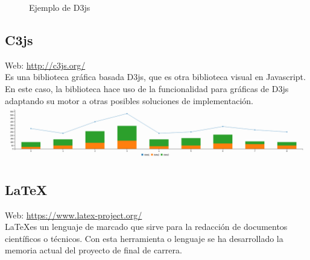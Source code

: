 \begin{figure}[H]
  \caption{Ejemplo de D3js}
\end{figure}

\subsection{C3js}

Web: \url{http://c3js.org/}\\

Es una biblioteca gráfica basada D3js, que es otra biblioteca visual en Javascript. En este caso, la biblioteca hace uso de la funcionalidad para gráficas de D3js adaptando su motor a otras posibles soluciones de implementación.\\

\includegraphics[scale=0.25]{diagramas/c3js-chart.png}

\subsection{\LaTeX}

Web: \url{https://www.latex-project.org/}\\

\LaTeX es un lenguaje de marcado que sirve para la redacción de documentos científicos o técnicos. Con esta herramienta o lenguaje se ha desarrollado la memoria actual del proyecto de final de carrera.

